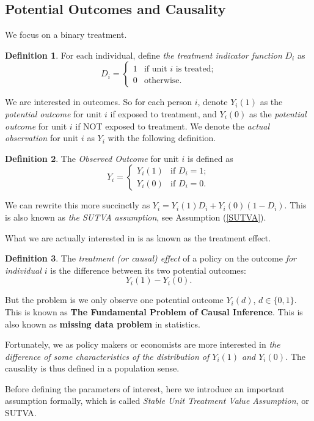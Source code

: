 \documentclass[11pt,a4paper]{amsart}
\theoremstyle{plain}
\theoremstyle{definition}
\newtheorem{definition}{Definition}
\begin{document}
\subsection{Potential Outcomes and Causality}\hfill\par 
	We focus on a binary treatment.
	\begin{definition}
	 For each individual, define \textit{the treatment indicator function} $D_{i}$ as 
		\[	D_{i} = 
		\begin{cases}
		1 &\text{if unit $i$ is treated;}\\
		0 &\text{otherwise.}
		\end{cases}	\]
	\end{definition}
	We are interested in outcomes. So for each person $i$, denote $Y_{i}(1)$ as the \textit{potential outcome} for unit $i$ if exposed to treatment, and $Y_{i}(0)$ as the \textit{potential outcome} for unit $i$ if NOT exposed to treatment. We denote the \textit{actual observation} for unit $i$ as $Y_{i}$  with the following definition. 
	\begin{definition}
	The	\textit{Observed Outcome} for unit $i$ is defined as
	\[	Y_{i} = \begin{cases}
		Y_{i}(1) &\text{if $D_{i} = 1$};\\
		Y_{i}(0) &\text{if $D_{i} = 0$}.
	\end{cases}	\]
	\end{definition}
	We can rewrite this more succinctly as $Y_{i} = Y_{i}(1)D_{i} + Y_{i}(0)(1-D_{i})$. This is also known as \textit{the SUTVA assumption}, see Assumption (\ref{SUTVA}).\par 
	What we are actually interested in is as known as the treatment effect. 
	\begin{definition}
		The \textit{treatment (or causal) eﬀect } of a policy on the outcome \emph{for individual $i$} is the difference between its two potential outcomes:
		\[	Y_{i}(1) - Y_{i}(0).	\]
	\end{definition}
	But the problem is we only observe one potential outcome $Y_{i}(d)$, $d \in \{0, 1\}$. This is known as \textbf{The Fundamental Problem of Causal Inference}. This is also known as \textbf{missing data problem} in statistics. \par 
	Fortunately, we as policy makers or economists are more interested in \emph{the diﬀerence of some characteristics of the distribution of $Y_{i}(1)$ and $Y_{i}(0)$.} The causality is thus defined in a population sense.\par 
	Before defining the parameters of interest, here we introduce an important assumption formally, which is called \textit{Stable Unit Treatment Value Assumption}, or SUTVA. 
\end{document}
